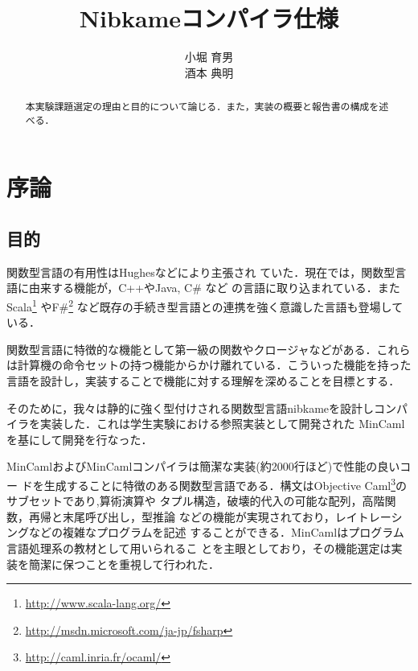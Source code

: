 \documentclass[a4paper,titlepage,disablejfam]{jsbook}
\begin{document}
\title{Nibkameコンパイラ仕様}
\author{
小堀 育男 \\
酒本 典明
}

\frontmatter

\maketitle

\tableofcontents

\newpage

\mainmatter %

\chapter{序論}\label{ch:intro}
\begin{abstract}
 本実験課題選定の理由と目的について論じる．また，実装の概要と報告書の構成を述べる．
\end{abstract}

\section{目的}
関数型言語の有用性はHughes\cite{hughes1989functional}などにより主張され
ていた．現在では，関数型言語に由来する機能が，C++やJava, C\# など
の言語に取り込まれている．またScala\footnote{\url{http://www.scala-lang.org/}}
やF\#{}\footnote{\url{http://msdn.microsoft.com/ja-jp/fsharp}}
など既存の手続き型言語との連携を強く意識した言語も登場している．

関数型言語に特徴的な機能として第一級の関数やクロージャなどがある．これら
は計算機の命令セットの持つ機能からかけ離れている．こういった機能を持った
言語を設計し，実装することで機能に対する理解を深めることを目標とする．

そのために，我々は静的に強く型付けされる関数型言語nibkameを設計しコンパ
イラを実装した．これは学生実験における参照実装として開発された
MinCaml\cite{住井英二郎:2008-04-24}を基にして開発を行なった．

MinCamlおよびMinCamlコンパイラは簡潔な実装(約2000行ほど)で性能の良いコー
ドを生成することに特徴のある関数型言語である．構文はObjective
Caml\footnote{\url{http://caml.inria.fr/ocaml/}}のサブセットであり,算術演算や
タプル構造，破壊的代入の可能な配列，高階関数，再帰と末尾呼び出し，型推論
などの機能が実現されており，レイトレーシングなどの複雑なプログラムを記述
することができる．MinCamlはプログラム言語処理系の教材として用いられるこ
とを主眼としており，その機能選定は実装を簡潔に保つことを重視して行われた．
\end{document}
